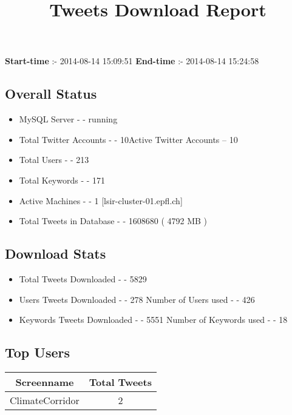 \documentclass{article}\usepackage[T1]{fontenc}
\begin{document}
\title{\textbf{Tweets Download Report}}
               \date{}
                \maketitle
               \centerline{\textbf{Start-time} :- 2014-08-14 15:09:51 \hspace{40pt} \textbf{End-time} :- 2014-08-14 15:24:58}               \subsection*{Overall Status}                \begin{itemize}                \item MySQL Server - - running               \item Total Twitter Accounts - - 10\newline Active Twitter Accounts -- 10               \item Total Users - - 213               \item Total Keywords - - 171               \item Active Machines - - 1 [lsir-cluster-01.epfl.ch]               \item Total Tweets in Database - - 1608680 ( 4792 MB )               \end{itemize}               \subsection*{Download Stats}                \begin{itemize}                \item Total Tweets Downloaded - - 5829               \item Users Tweets Downloaded - - 278 \newline Number of Users used - - 426               \item Keywords Tweets Downloaded - - 5551 \newline Number of Keywords used - - 18              \end{itemize}              \subsection*{Top Users}\begin{tabular}{|c|c|}         \hline         Screenname & Total Tweets \\ 
 \hline
ClimateCorridor & 2\\ 
 \hline

\end{tabular}
\end{document}
